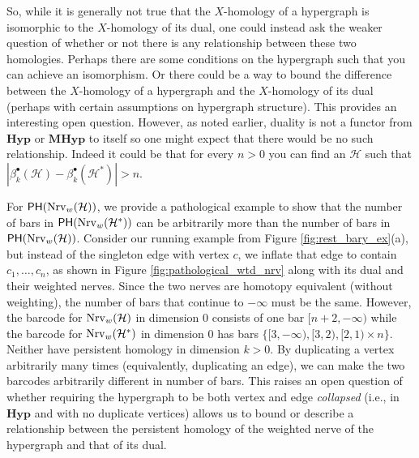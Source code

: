 \documentclass{amsart}
\newcommand{\Hyp}{\mathrm{\textbf{Hyp}}}
\newcommand{\MHyp}{\mathrm{\textbf{MHyp}}}
\newcommand{\PH}	     {\mm{\mathsf{PH}}}
\newcommand{\betti}[2]{\beta_{#2}^{#1}}
\renewcommand{\H}{\mathcal{H}}
\newcommand{\Nrv}{\mm{\mathrm{Nrv}}}
\newcommand {\mm}[1]        {\ifmmode{#1}\else{\mbox{\(#1\)}}\fi}
\begin{document}
So, while it is generally not true that the $X$-homology of a hypergraph is isomorphic to the $X$-homology of its dual, one could instead ask the weaker question of whether or not there is any relationship between these two homologies. Perhaps there are some conditions on the hypergraph such that you can achieve an isomorphism. Or there could be a way to bound the difference between the $X$-homology of a hypergraph and the $X$-homology of its dual (perhaps with certain assumptions on hypergraph structure). This provides an interesting open question. However, as noted earlier, duality is not a functor from $\Hyp$ or $\MHyp$ to itself so one might expect that there would be no such relationship. Indeed it could be that for every $n > 0$ you can find an $\H$ such that $|\betti{\bullet}{k}(\H) - \betti{\bullet}{k}(\H^*)| > n$.

For $\PH(\Nrv_w(\H))$, we provide a pathological example to show that the number of bars in $\PH(\Nrv_w(\H^*))$ can be arbitrarily more than the number of bars in $\PH(\Nrv_w(\H))$. Consider our running example from Figure \ref{fig:rest_bary_ex}(a), but instead of the singleton edge with vertex $c$, we inflate that edge to contain $c_1, \ldots, c_n$, as shown in Figure \ref{fig:pathological_wtd_nrv} along with its dual and their weighted nerves. Since the two nerves are homotopy equivalent (without weighting), the number of bars that continue to $-\infty$ must be the same. However, the barcode for $\Nrv_w(\H)$ in dimension 0 consists of one bar $[n+2, -\infty)$ while the barcode for $\Nrv_w(\H^*)$ in dimension 0 has bars $\{[3,-\infty), [3,2), [2,1)\times n\}$. Neither have persistent homology in dimension $k > 0$. By duplicating a vertex arbitrarily many times (equivalently, duplicating an edge), we can make the two barcodes arbitrarily different in number of bars. This raises an open question of whether requiring the hypergraph to be both vertex and edge \emph{collapsed} (i.e., in $\Hyp$ and with no duplicate vertices) allows us to bound or describe a relationship between the persistent homology of the weighted nerve of the hypergraph and that of its dual.

\end{document}
